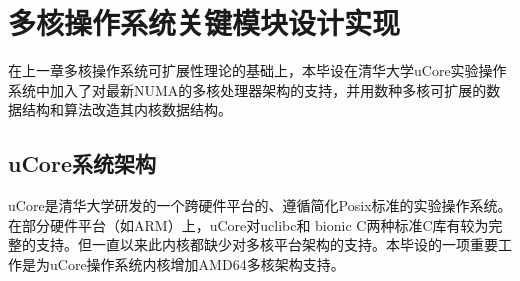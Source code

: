 
\chapter{多核操作系统关键模块设计实现}
在上一章多核操作系统可扩展性理论的基础上，本毕设在清华大学uCore实验操作系统中加入了对最新NUMA的多核处理器架构的支持，并用数种多核可扩展的数据结构和算法改造其内核数据结构。

\section{uCore系统架构}
uCore是清华大学研发的一个跨硬件平台的、遵循简化Posix标准的实验操作系统。在部分硬件平台（如ARM）上，uCore对uclibc和
bionic
C两种标准C库有较为完整的支持。但一直以来此内核都缺少对多核平台架构的支持。本毕设的一项重要工作是为uCore操作系统内核增加AMD64多核架构支持。

